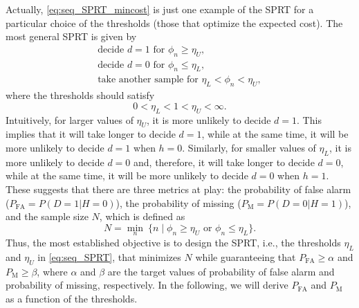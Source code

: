 Actually, \eqref{eq:seq_SPRT_mincost} is just one example of the SPRT for a particular choice of the thresholds (those that optimize the expected cost). The most general SPRT is given by
\begin{equation}
	\label{eq:seq_SPRT}
	\begin{array}{l}
		\text{decide } d = 1 \text{ for } \phi_n \geq \eta_U, \\
		\text{decide } d = 0 \text{ for } \phi_n \leq  \eta_L, \\
		\text{take another sample for } \eta_L < \phi_n < \eta_U,
	\end{array}
\end{equation}
where the thresholds should satisfy
\begin{equation*}
	0 < \eta_L < 1 < \eta_U < \infty.
\end{equation*}
Intuitively, for larger values of $\eta_U$, it is more unlikely to decide $d = 1$. This implies that it will take longer to decide $d = 1$, while at the same time, it will be more unlikely to decide $d = 1$ when $h = 0$. Similarly, for smaller values of $\eta_L$, it is more unlikely to decide $d = 0$ and, therefore, it will take longer to decide $d = 0$, while at the same time, it will be more unlikely to decide $d = 0$ when $h = 1$. These suggests that there are three metrics at play: the probability of false alarm ($P_{\text{FA}} = P(D = 1 | H = 0)$), the probability of missing ($P_{\text{M}} = P(D = 0 | H = 1)$), and the sample size $N$, which is defined as
\begin{equation*}
	\label{eq:sample_size}
	N =  \min_{n} \ \{n \mid \phi_n \geq \eta_U \text{ or } \phi_n \leq \eta_L\}. 
\end{equation*}
Thus,  the most established objective is to design the SPRT, i.e., the thresholds $\eta_L$ and $\eta_U$ in \eqref{eq:seq_SPRT}, that minimizes $N$ while guaranteeing that $P_{\text{FA}} \geq \alpha$ and $P_{\text{M}} \geq \beta$, where $\alpha$ and $\beta$ are the target values of probability of false alarm and probability of missing, respectively. In the following, we will derive $P_{\text{FA}}$ and $P_{\text{M}}$ as a function of the thresholds.

